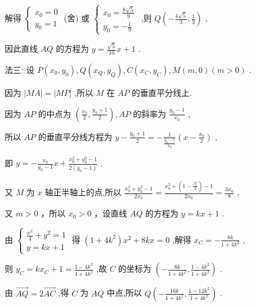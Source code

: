\documentclass[10pt]{article}
\begin{document}
解得 \(\left\{  \begin{array}{l} {x}_{0} = 0 \\  {y}_{0} = 1 \end{array}\right.\) (舍) 或 \(\left\{  \begin{array}{l} {x}_{0} = \frac{8\sqrt{5}}{9} \\  {y}_{0} =  - \frac{1}{9} \end{array}\right.\) ,则 \(Q\left( {-\frac{4\sqrt{5}}{3},\frac{1}{3}}\right)\) ,

因此直线 \({AQ}\) 的方程为 \(y = \frac{\sqrt{5}}{10}x + 1\) .

法三: 设 \(P\left( {{x}_{0},{y}_{0}}\right) ,Q\left( {{x}_{Q},{y}_{Q}}\right) ,C\left( {{x}_{C},{y}_{C}}\right) ,M\left( {m,0}\right) \left( {m > 0}\right)\) .

因为 \(\left| {MA}\right|  = \left| {MP}\right|\) ,所以 \(M\) 在 \({AP}\) 的垂直平分线上.

因为 \({AP}\) 的中点为 \(\left( {\frac{{x}_{0}}{2},\frac{{y}_{0} + 1}{2}}\right) ,{AP}\) 的斜率为 \(\frac{{y}_{0} - 1}{{x}_{0}}\) ,

所以 \({AP}\) 的垂直平分线方程为 \(y - \frac{{y}_{0} + 1}{2} =  - \frac{1}{\frac{{y}_{0} - 1}{{x}_{0}}}\left( {x - \frac{{x}_{0}}{2}}\right)\) ,

即 \(y =  - \frac{{x}_{0}}{{y}_{0} - 1}x + \frac{{x}_{0}^{2} + {y}_{0}^{2} - 1}{2\left( {{y}_{0} - 1}\right) }\) .

又 \(M\) 为 \(x\) 轴正半轴上的点,所以 \(\frac{{x}_{0}^{2} + {y}_{0}^{2} - 1}{2{x}_{0}} = \frac{{x}_{0}^{2} + \left( {1 - \frac{{x}_{0}^{2}}{4}}\right)  - 1}{2{x}_{0}} = \frac{3{x}_{0}}{8}\) ,

又 \(m > 0\) ，所以 \({x}_{0} > 0\) ，设直线 \({AQ}\) 的方程为 \(y = {kx} + 1\) .

由 \(\left\{  \begin{array}{l} \frac{{x}^{2}}{4} + {y}^{2} = 1 \\  y = {kx} + 1 \end{array}\right.\) 得 \(\left( {1 + 4{k}^{2}}\right) {x}^{2} + {8kx} = 0\) ,解得 \({x}_{C} =  - \frac{8k}{1 + 4{k}^{2}}\) ,

则 \({y}_{C} = k{x}_{C} + 1 = \frac{1 - 4{k}^{2}}{1 + 4{k}^{2}}\) ,故 \(C\) 的坐标为 \(\left( {-\frac{8k}{1 + 4{k}^{2}},\frac{1 - 4{k}^{2}}{1 + 4{k}^{2}}}\right)\) .

由 \(\overrightarrow{AQ} = 2\overrightarrow{AC}\) ,得 \(C\) 为 \({AQ}\) 中点,所以 \(Q\left( {-\frac{16k}{1 + 4{k}^{2}},\frac{1 - {12}{k}^{2}}{1 + 4{k}^{2}}}\right)\) .
\end{document}
